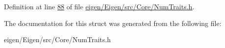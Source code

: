 Definition at line \hyperlink{eigen_2_eigen_2src_2_core_2_num_traits_8h_source_l00088}{88} of file \hyperlink{eigen_2_eigen_2src_2_core_2_num_traits_8h_source}{eigen/\+Eigen/src/\+Core/\+Num\+Traits.\+h}.



The documentation for this struct was generated from the following file\+:\begin{DoxyCompactItemize}
\item 
eigen/\+Eigen/src/\+Core/\+Num\+Traits.\+h\end{DoxyCompactItemize}
